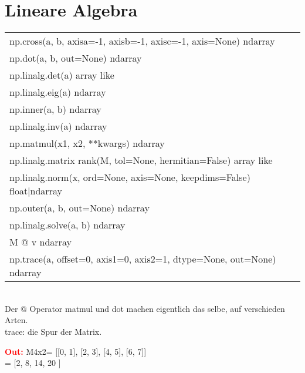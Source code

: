 \newpage
\section*{Lineare Algebra}
\hspace{1cm}
\begin{tabular}{|l l|}
	\hline
	np.cross(a, b, axisa=-1, axisb=-1, axisc=-1, axis=None) ndarray
	\\np.dot(a, b, out=None) ndarray
	\\np.linalg.det(a) array like
	\\np.linalg.eig(a) ndarray
	\\np.inner(a, b) ndarray
	\\np.linalg.inv(a) ndarray
	\\np.matmul(x1, x2, **kwargs) ndarray
	\\np.linalg.matrix rank(M, tol=None, hermitian=False) array like
	\\np.linalg.norm(x, ord=None, axis=None, keepdims=False) float|ndarray
	\\np.outer(a, b, out=None) ndarray
	\\np.linalg.solve(a, b) ndarray
	\\M @ v ndarray
	\\np.trace(a, offset=0, axis1=0, axis2=1, dtype=None, out=None) ndarray
	
	\\\hline
\end{tabular}
\\
Der @ Operator matmul und dot machen eigentlich das selbe, auf verschieden Arten.\\
trace: die Spur der Matrix.

\vspace{0.5cm}
\begin{minipage}[h]{12cm}
	
	
\end{minipage}
\begin{minipage}[h]{8cm}
	\textcolor{red}{\textbf{Out:}}
	M4x2= [[0, 1],
	[2, 3],
	[4, 5],
	[6, 7]]
	\\
	= [2,  8, 14, 20 ]
	\\
	
	
\end{minipage}


